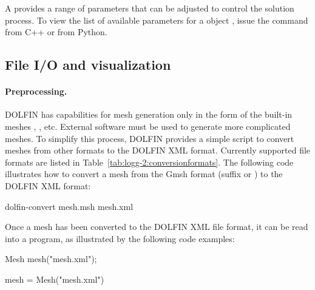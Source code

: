 A  provides a range of parameters that can be
adjusted to control the solution process. To view the list of available
parameters for a  object , issue
the command  from C++ or  from Python.

\subsection{File I/O and visualization}

\paragraph{Preprocessing.}

DOLFIN has capabilities for mesh generation only in the form of the
built-in meshes , , etc.  External software
must be used to generate more complicated meshes. To simplify this
process, DOLFIN provides a simple script  to convert
meshes from other formats to the DOLFIN XML format. Currently supported
file formats are listed in Table~\ref{tab:logg-2:conversionformats}. The
following code illustrates how to convert a mesh from the Gmsh format
(suffix  or ) to the DOLFIN XML format:
\begin{bash}
dolfin-convert mesh.msh mesh.xml
\end{bash}
Once a mesh has been converted to the DOLFIN XML file format, it can be
read into a program, as illustrated by the following code examples:
\begin{c++}
Mesh mesh("mesh.xml");
\end{c++}
\begin{python}
mesh = Mesh("mesh.xml")
\end{python}

